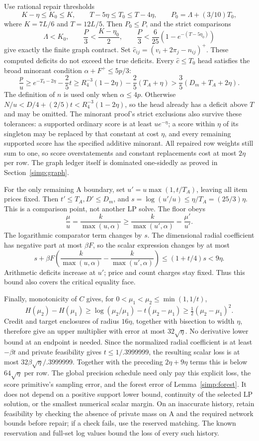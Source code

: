 Use rational repair thresholds
\[
 K-\eta\le K_0\le K,\qquad
 T-5\eta\le T_0\le T-4\eta,\qquad
 P_0=\Lambda+(3/10)T_0,
\]
where $K=7L/6$ and $T=12L/5$.
Then $P_0\le P$, and the strict comparisons
\[
 \Lambda<K_0,\qquad
 \frac P3<\frac{K-\eta_0}{2},\qquad
 \frac P3<\frac6{25}(1-e^{-(T-5\eta_0)})
\]
give exactly the finite graph contract.  Set
$\widehat c_{ij}=(v_i+2\pi_j-n_{ij})^+$.  These computed deficits
do not exceed the true deficits.  Every $\widehat c\le T_0$ head
satisfies the broad minorant condition $\alpha+F^+\le5p/3$:
\[
 \frac p u\ge e^{-T_0-2\eta}-\frac25t
 \ge R_4^{-3}(1-2\eta)-\frac25(T_A+\eta)
 >\frac35(D_m+T_A+2\eta).
\]
The definition of $n$ is used only when $\alpha\le4p$.
Otherwise $N/u<D/4+(2/5)t<R_4^{-3}(1-2\eta)$, so the head
already has a deficit above $T$ and may be omitted.
The minorant proof's strict exclusions also survive these
tolerances: a supported ordinary score is at least $ue^{-\eta}$;
a score within $\eta$ of its singleton may be replaced by that
constant at cost $\eta$, and every remaining supported score
has the specified additive minorant.  All repaired row weights
still sum to one, so score overstatements and constant replacements
cost at most $2\eta$ per row.  The graph ledger itself is dominated
one-sidedly as proved in Section~\ref{simp:graph}.

For the only remaining A boundary, set
$u'=u\max(1,t/T_A)$, leaving all item prices fixed.
Then $t'\le T_A,D'\le D_m$, and
$s=\log(u'/u)\le\eta/T_A=(25/3)\eta$.
This is a comparison point, not another LP solve.  The floor obeys
\[
 \frac\mu u=\frac{k}{\max(u,\alpha)}
 \ge\frac{k}{\max(u',\alpha)}=\frac{\mu'}{u'}.
\]
The logarithmic comparator term changes by $s$.  The dimensional
radial coefficient has negative part at most $\beta F$, so the
scalar expression changes by at most
\[
 s+\beta F\left(\frac{k}{\max(u,\alpha)}
          -\frac{k}{\max(u',\alpha)}\right)
 \le(1+t/4)s<9\eta.
\]
Arithmetic deficits increase at $u'$; price and count charges stay
fixed.  Thus this bound also covers the critical equality face.

Finally, monotonicity of $C$ gives, for
$0<\mu_1<\mu_2\le\min(1,1/t)$,
\[
 H(\mu_2)-H(\mu_1)
 \ge\log(\mu_2/\mu_1)-t(\mu_2-\mu_1)
 \ge\tfrac12(\mu_2-\mu_1)^2.
\]
Credit and target enclosures of radius $16\eta$, together with
bisection to width $\eta$, therefore give an upper multiplier
with error at most $32\sqrt\eta$.  No derivative lower bound at
an endpoint is needed.  Since the normalized radial coefficient
is at least $-\beta t$ and private feasibility gives
$t\le1/.3999999$, the resulting scalar loss is at most
$32\beta\sqrt\eta/.3999999$.  Together with the preceding
$2\eta+9\eta$ terms this is below $64\sqrt\eta$ per row.
The global precision schedule need only pay this explicit loss,
the score primitive's sampling error, and the forest error of
Lemma~\ref{simp:forest}.  It does not depend on a positive support
lower bound, continuity of the selected LP solution, or the smallest
numerical scalar margin.
On an inaccurate history, retain feasibility by checking the absence
of private mass on A and the required network bounds before repair;
if a check fails, use the reserved matching.  The known reservation
and full-set log values bound the loss of every such history.
